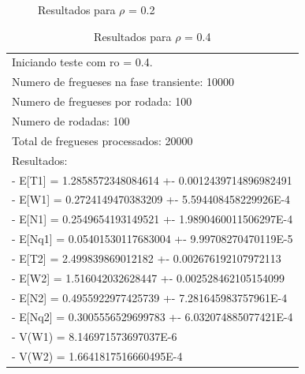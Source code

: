 \documentclass[a4paper,12pt]{report}
\begin{document}
\begin{figure}[htbp]
   \centering
   \caption{Resultados para $\rho$ = 0.2}
\end{figure}

\begin{table}[htbp]
  \begin{tabular}{l}
	\small Iniciando teste com ro = 0.4. \\
	\small Numero de fregueses na fase transiente: 10000 \\
	\small Numero de fregueses por rodada: 100 \\
	\small Numero de rodadas: 100 \\
	\small Total de fregueses processados: 20000 \\
	\small Resultados: \\
	\small - E[T1] = 1.2858572348084614 +- 0.0012439714896982491 \\
	\small - E[W1] = 0.2724149470383209 +- 5.594408458229926E-4 \\
	\small - E[N1] = 0.2549654193149521 +- 1.9890460011506297E-4 \\
	\small - E[Nq1] = 0.05401530117683004 +- 9.99708270470119E-5 \\
	\small - E[T2] = 2.499839869012182 +- 0.002676192107972113 \\
	\small - E[W2] = 1.516042032628447 +- 0.002528462105154099 \\
	\small - E[N2] = 0.4955922977425739 +- 7.281645983757961E-4 \\
	\small - E[Nq2] = 0.3005556529699783 +- 6.032074885077421E-4 \\
	\small - V(W1) = 8.146971573697037E-6 \\
	\small - V(W2) = 1.6641817516660495E-4 \\
  \end{tabular}
\caption{Resultados para $\rho$ = 0.4}
\end{table}
\end{document}
